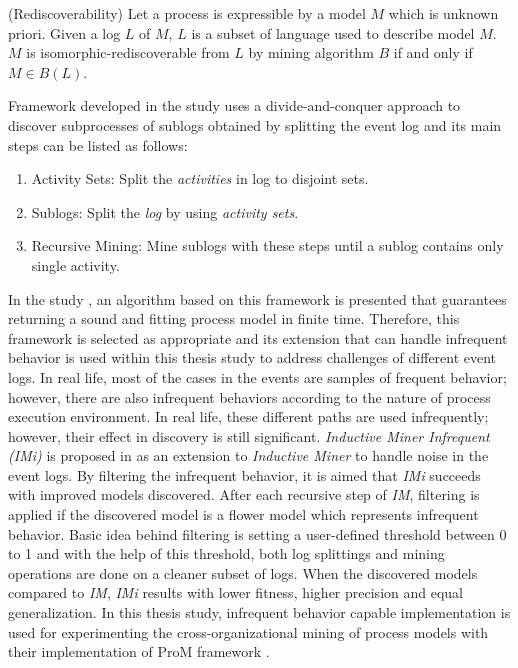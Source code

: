 \theoremstyle{definition}
\begin{definition}{}
(Rediscoverability) Let a process is expressible by a model $M$ which is unknown priori. Given a log $L$ of $M$, $L$ is a subset of language used to describe model $M$. $M$ is isomorphic-rediscoverable from $L$ by mining algorithm $B$ if and only if $M \in B(L)$.
\end{definition}
 
Framework developed in the study \cite{leemans2013discovering} uses a divide-and-conquer approach to discover subprocesses of sublogs obtained by splitting the event log and its main steps can be listed as follows:
\begin{enumerate}
  \item Activity Sets: Split the \textit{activities} in log to disjoint sets.
  \item Sublogs: Split the \textit{log} by using \textit{activity sets}.
  \item Recursive Mining: Mine sublogs with these steps until a sublog contains only single activity.
\end{enumerate}

In the study \cite{leemans2013discovering}, an algorithm based on this framework is presented that guarantees returning a sound and fitting process model in finite time. Therefore, this framework is selected as appropriate and its extension that can handle infrequent behavior is used within this thesis study to address challenges of different event logs. In real life, most of the cases in the events are samples of frequent behavior; however, there are also infrequent behaviors according to the nature of process execution environment. In real life, these different paths are used infrequently; however, their effect in discovery is still significant. \textit{Inductive Miner Infrequent (IMi)} is proposed in \cite{leemans2014discoveringinfrequent} as an extension to \textit{Inductive Miner} to handle noise in the event logs. By filtering the infrequent behavior, it is aimed that \textit{IMi} succeeds with improved models discovered. After each recursive step of \textit{IM}, filtering is applied if the discovered model is a flower model which represents infrequent behavior. Basic idea behind filtering is setting a user-defined threshold between 0 to 1 and with the help of this threshold, both log splittings and mining operations are done on a cleaner subset of logs. When the discovered models compared to \textit{IM}, \textit{IMi} results with lower fitness, higher precision and equal generalization.
In this thesis study, infrequent behavior capable implementation is used for experimenting the cross-organizational mining of process models with their implementation of ProM framework \cite{verbeek2010prom}.

